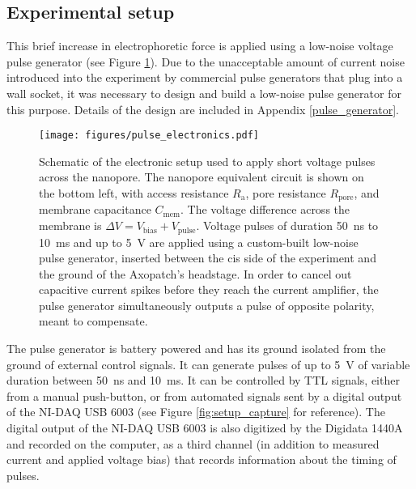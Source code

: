 \subsection{Experimental setup}

This brief increase in electrophoretic force is applied using a low-noise voltage pulse generator (see Figure \ref{fig:helicase_pulse_setup}).  Due to the unacceptable amount of current noise introduced into the experiment by commercial pulse generators that plug into a wall socket, it was necessary to design and build a low-noise pulse generator for this purpose.  Details of the design are included in Appendix \ref{pulse_generator}.

\begin{figure}[h]
\begin{centering}
\texttt{[image: figures/pulse\_electronics.pdf]}
\caption[Electronic setup for low-noise pulses across a nanopore]{Schematic of the electronic setup used to apply short voltage pulses across the nanopore.  The nanopore equivalent circuit is shown on the bottom left, with access resistance $R_{\text{a}}$, pore resistance $R_{\text{pore}}$, and membrane capacitance $C_{\text{mem}}$.  The voltage difference across the membrane is $\Delta V = V_{\text{bias}} + V_{\text{pulse}}$.  Voltage pulses of duration \SI{50}{\ns} to \SI{10}{\ms} and up to \SI{5}{\V} are applied using a custom-built low-noise pulse generator, inserted between the cis side of the experiment and the ground of the Axopatch's headstage.  In order to cancel out capacitive current spikes before they reach the current amplifier, the pulse generator simultaneously outputs a pulse of opposite polarity, meant to compensate.}
\label{fig:helicase_pulse_setup}
\end{centering}
\end{figure}

The pulse generator is battery powered and has its ground isolated from the ground of external control signals.  It can generate pulses of up to \SI{5}{\V} of variable duration between \SI{50}{\ns} and \SI{10}{\ms}.  It can be controlled by TTL signals, either from a manual push-button, or from automated signals sent by a digital output of the NI-DAQ USB 6003 (see Figure \ref{fig:setup_capture} for reference).  The digital output of the NI-DAQ USB 6003 is also digitized by the Digidata 1440A and recorded on the computer, as a third channel (in addition to measured current and applied voltage bias) that records information about the timing of pulses.

